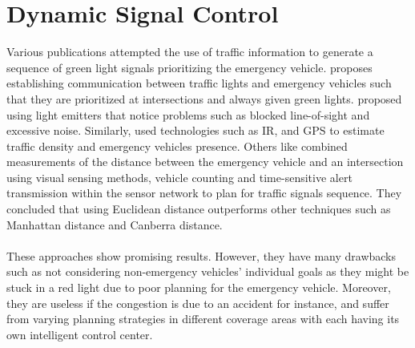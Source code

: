 \section{Dynamic Signal Control}
\label{Dynamic_signal_control}
Various publications attempted the use of traffic information to generate a sequence of green light signals prioritizing the emergency vehicle. \cite{paper5} proposes establishing communication between traffic lights and emergency vehicles such that they are prioritized at intersections and always given green lights. \cite{paper6} proposed using light emitters that notice problems such as blocked line-of-sight and excessive noise. Similarly, \cite{paper7} used technologies such as IR, and GPS to estimate traffic density and emergency vehicles presence. Others like \cite{paper8} combined measurements of the distance between the emergency vehicle and an intersection using visual sensing methods, vehicle counting and time-sensitive alert transmission within the sensor network to plan for traffic signals sequence. They concluded that using Euclidean distance outperforms other techniques such as Manhattan distance and Canberra distance.
\\ \\ 
These approaches show promising results. However, they have many drawbacks such as not considering non-emergency vehicles’ individual goals as they might be stuck in a red light due to poor planning for the emergency vehicle. Moreover, they are useless if the congestion is due to an accident for instance, and suffer from varying planning strategies in different coverage areas with each having its own intelligent control center.
